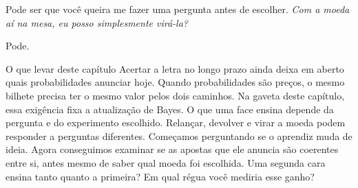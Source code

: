 Pode ser que você queira me fazer uma pergunta antes de escolher. \emph{Com a moeda aí na mesa, eu posso simplesmente virá-la?}

Pode.

\begin{quadro}{O que levar deste capítulo}
 Acertar a letra no longo prazo ainda deixa em aberto quais probabilidades anunciar hoje.
 Quando probabilidades são preços, o mesmo bilhete precisa ter o mesmo valor pelos dois caminhos. Na gaveta deste capítulo, essa exigência fixa a atualização de Bayes.
 O que uma face ensina depende da pergunta e do experimento escolhido. Relançar, devolver e virar a moeda podem responder a perguntas diferentes.
 Começamos perguntando se o aprendiz muda de ideia. Agora conseguimos examinar se as apostas que ele anuncia são coerentes entre si, antes mesmo de saber qual moeda foi escolhida.
 Uma segunda cara ensina tanto quanto a primeira? Em qual régua você mediria esse ganho?
\end{quadro}
